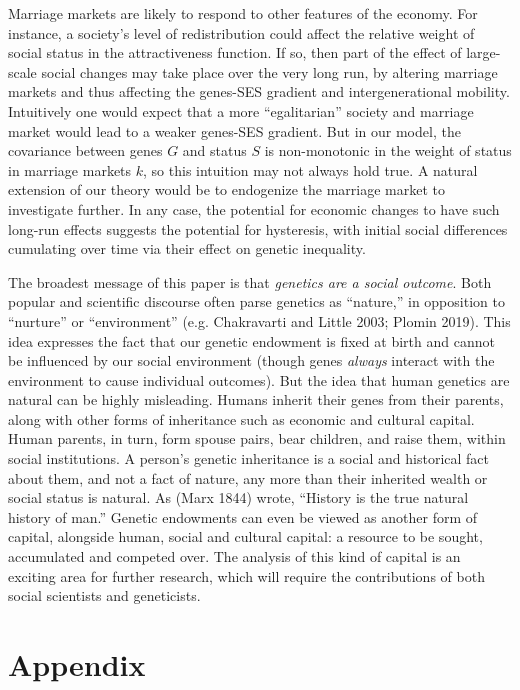 \documentclass[
]{article}
\begin{document}
Marriage markets are likely to respond to other features of the economy. For
instance, a society's level of redistribution could affect the relative weight
of social status in the attractiveness function. If so, then part of the effect
of large-scale social changes may take place over the very long run, by altering
marriage markets and thus affecting the genes-SES gradient and intergenerational
mobility. Intuitively one would expect that a more ``egalitarian'' society and
marriage market would lead to a weaker genes-SES gradient. But in our model, the
covariance between genes \(G\) and status \(S\) is non-monotonic in the weight of
status in marriage markets \(k\), so this intuition may not always hold true. A
natural extension of our theory would be to endogenize the marriage market to
investigate further. In any case, the potential for economic changes to have
such long-run effects suggests the potential for hysteresis, with initial social
differences cumulating over time via their effect on genetic inequality.

The broadest message of this paper is that \emph{genetics are a social
outcome}. Both popular and scientific discourse often parse genetics as
``nature,'' in opposition to ``nurture'' or ``environment'' (e.g. Chakravarti and Little 2003; Plomin 2019). This idea expresses the
fact that our genetic endowment is fixed at birth and cannot be
influenced by our social environment (though genes \emph{always} interact with the
environment to cause individual outcomes). But the idea that human
genetics are natural can be highly misleading. Humans inherit their
genes from their parents, along with other forms of inheritance such as
economic and cultural capital. Human parents, in turn, form spouse
pairs, bear children, and raise them, within social institutions. A
person's genetic inheritance is a social and historical fact about them,
and not a fact of nature, any more than their inherited wealth or social
status is natural. As (Marx 1844) wrote, ``History is the true
natural history of man.'' Genetic endowments can even be viewed as
another form of capital, alongside human, social and cultural capital: a
resource to be sought, accumulated and competed over. The analysis of
this kind of capital is an exciting area for further research, which
will require the contributions of both social scientists and
geneticists.

\FloatBarrier

\newpage

\hypertarget{appendix}{%
\section{Appendix}\label{appendix}}
\end{document}
